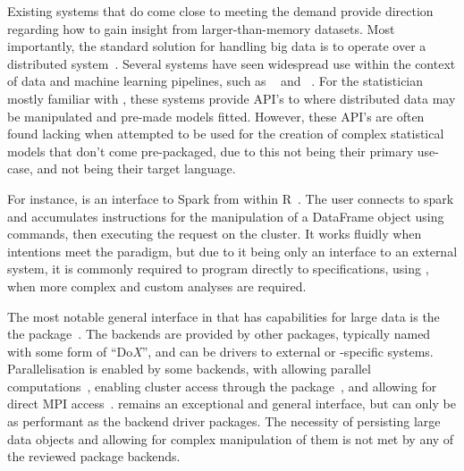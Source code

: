 \documentclass[letterpaper, inpress]{jds} %
\begin{document}
Existing systems that do come close to meeting the demand provide direction regarding how to gain insight from larger-than-memory datasets.
Most importantly, the standard solution for handling big data is to operate over a distributed system~\citep{boja2012distributed}.
Several systems have seen widespread use within the context of data and machine learning pipelines, such as ~\citep{zaharia2016apache} and ~\citep{shvachko2010hadoop}.
For the statistician mostly familiar with , these systems provide API's to  where distributed data may be manipulated and pre-made models fitted.
However, these API's are often found lacking when attempted to be used for the creation of complex statistical models that don't come pre-packaged, due to this not being their primary use-case, and  not being their target language.

For instance,  is an interface to Spark from within R~\citep{luraschi20}.
The user connects to spark and accumulates instructions for the manipulation of a  DataFrame object using  commands, then executing the request on the  cluster.
It works fluidly when intentions meet the  paradigm, but due to it being only an interface to an external system, it is commonly required to program directly to  specifications, using , when more complex and custom analyses are required.

The most notable general interface in  that has capabilities for large data is the the  package~\citep{microsoft20}.
The backends are provided by other packages, typically named with some form of ``Do\emph{X}'', and can be drivers to external or -specific systems.
Parallelisation is enabled by some backends, with  allowing parallel computations~\citep{corporation19},  enabling cluster access through the  package~\citep{dosnow19}, and  allowing for direct MPI access~\citep{weston17}.
 remains an exceptional and general interface, but can only be as performant as the backend driver packages.
The necessity of persisting large data objects and allowing for complex manipulation of them is not met by any of the reviewed package backends.
\end{document}
